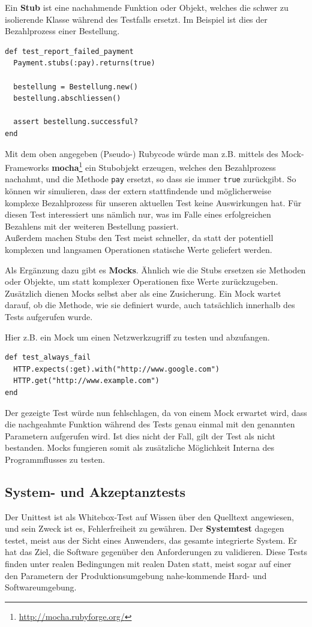   Ein \textbf{Stub} ist eine nachahmende Funktion oder Objekt, welches die schwer zu isolierende Klasse während des Testfalls ersetzt. Im Beispiel ist dies der Bezahlprozess einer Bestellung. %
  \begin{lstlisting}
def test_report_failed_payment
  Payment.stubs(:pay).returns(true)
  
  bestellung = Bestellung.new()
  bestellung.abschliessen()
  
  assert bestellung.successful?
end
  \end{lstlisting}
  Mit dem oben angegeben (Pseudo-) Rubycode würde man z.B. mittels des Mock-Frameworks \textbf{mocha}\footnote{\url{http://mocha.rubyforge.org/}} ein Stubobjekt erzeugen, welches den Bezahlprozess nachahmt, und die Methode \texttt{pay} ersetzt, so dass sie immer \texttt{true} zurückgibt. So können wir simulieren, dass der extern stattfindende und möglicherweise komplexe Bezahlprozess für unseren aktuellen Test keine Auswirkungen hat. Für diesen Test interessiert uns nämlich nur, was im Falle eines erfolgreichen Bezahlens mit der weiteren Bestellung passiert.\\  
  Außerdem machen Stubs den Test meist schneller, da statt der potentiell komplexen und langsamen Operationen statische Werte geliefert werden.  
  
  Als Ergänzung dazu gibt es \textbf{Mocks}. Ähnlich wie die Stubs ersetzen sie Methoden oder Objekte, um statt komplexer Operationen fixe Werte zurückzugeben. Zusätzlich dienen Mocks selbst aber als eine Zusicherung. Ein Mock wartet darauf, ob die Methode, wie sie definiert wurde, auch tatsächlich innerhalb des Tests aufgerufen wurde.
  
  Hier z.B. ein Mock um einen Netzwerkzugriff zu testen und abzufangen. %
  \begin{lstlisting}
def test_always_fail
  HTTP.expects(:get).with("http://www.google.com")
  HTTP.get("http://www.example.com")
end
  \end{lstlisting}
  Der gezeigte Test würde nun fehlschlagen, da von einem Mock erwartet wird, dass die nachgeahmte Funktion während des Tests genau einmal mit den genannten Parametern aufgerufen wird. Ist dies nicht der Fall, gilt der Test als nicht bestanden. Mocks fungieren somit als zusätzliche Möglichkeit Interna des Programmflusses zu testen. 

\subsection{System- und Akzeptanztests}
\label{sec:acceptance}
Der Unittest ist als Whitebox-Test auf Wissen über den Quelltext angewiesen, und sein Zweck ist es, Fehlerfreiheit zu gewähren. Der \textbf{Systemtest} dagegen testet, meist aus der Sicht eines Anwenders, das gesamte integrierte System. Er hat das Ziel, die Software gegenüber den Anforderungen zu validieren. Diese Tests finden unter realen Bedingungen mit realen Daten statt, meist sogar auf einer den Parametern der Produktionsumgebung nahe-kommende Hard- und Softwareumgebung.

